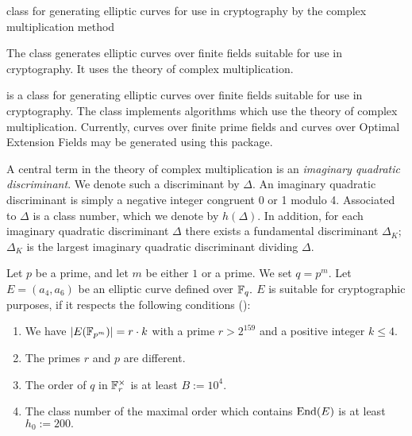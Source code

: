 


\NAME

\dotfill
class for generating elliptic curves for use in cryptography by
the complex multiplication method



\ABSTRACT

The class 
generates elliptic curves over finite fields suitable for use
in cryptography. It uses the theory of complex multiplication.



\DESCRIPTION

 is a class for
generating elliptic curves over finite fields suitable for use
in cryptography. The class implements
algorithms which use the theory of complex multiplication.
Currently, curves over finite prime fields
and curves over Optimal Extension Fields may be generated using
this package.

A central term in the theory of complex multiplication
is an \emph{imaginary quadratic discriminant}.
We denote such a discriminant by $\Delta.$
An imaginary quadratic discriminant is
simply a negative integer congruent 0 or 1
modulo 4. Associated to $\Delta$ is
a class number, which we denote by $h(\Delta).$
In addition, for each imaginary quadratic discriminant
$\Delta$ there exists a fundamental discriminant $\Delta_K;$
$\Delta_K$ is the largest imaginary quadratic discriminant
dividing $\Delta.$

Let $p$ be a prime, and let $m$ be either $1$ or
a prime. We set $q=p^m.$
Let $E=(a_4,a_6)$ be an elliptic curve defined
over $\mathbb{F}_q.$
$E$ is suitable for
cryptographic purposes, if it respects the following
conditions (\cite{BSI01}):

\begin{enumerate} 
\item\label{cond_sq_gec} We have $|E(\mathbb{F}_{p^m})| =r\cdot k$ with a prime 
$r> 2^{159}$ and a positive integer $k\leq 4.$
\item\label{cond_smart_gec} The primes $r$ and $p$ are different.
\item\label{cond_mov_gec} The order of $q$ in $\mathbb{F}_r^\times$
is at least $B:=10^4.$
\item\label{cond_bsi_gec} The class number of the maximal order which
contains $\operatorname{End}(E)$ is at least $h_0:=200.$
\end{enumerate}


